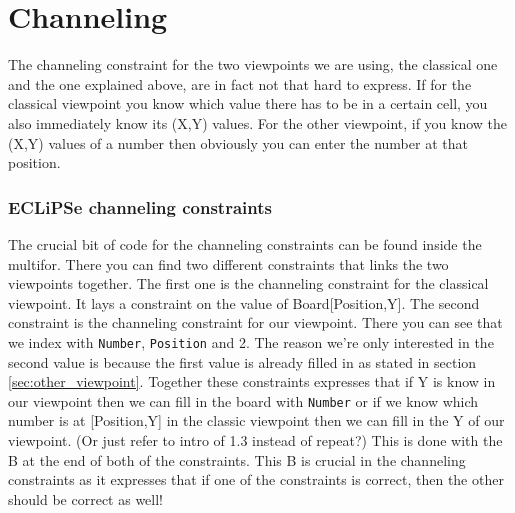 \documentclass{report}
\begin{document}
\section{Channeling}
The channeling constraint for the two viewpoints we are using, the classical one and the one explained above, are in fact not that hard to express. If for the classical viewpoint you know which value there has to be in a certain cell, you also immediately know its (X,Y) values. For the other viewpoint, if you know the (X,Y) values of a number then obviously you can enter the number at that position.

\subsubsection{ECLiPSe channeling constraints}

	The crucial bit of code for the channeling constraints can be found inside the multifor. There you can find two different constraints that links the two viewpoints together. The first one is the channeling constraint for the classical viewpoint. It lays a constraint on the value of Board[Position,Y]. The second constraint is the channeling constraint for our viewpoint. There you can see that we index with \texttt{Number}, \texttt{Position} and 2. The reason we're only interested in the second value is because the first value is already filled in as stated in section \ref{sec:other_viewpoint}. Together these constraints expresses that if Y is know in our viewpoint then we can fill in the board with \texttt{Number} or if we know which number is at [Position,Y] in the classic viewpoint then we can fill in the Y of our viewpoint. (Or just refer to intro of 1.3 instead of repeat?) This is done with the B at the end of both of the constraints. This B is crucial in the channeling constraints as it expresses that if one of the constraints is correct, then the other should be correct as well!

\newpage
\end{document}
